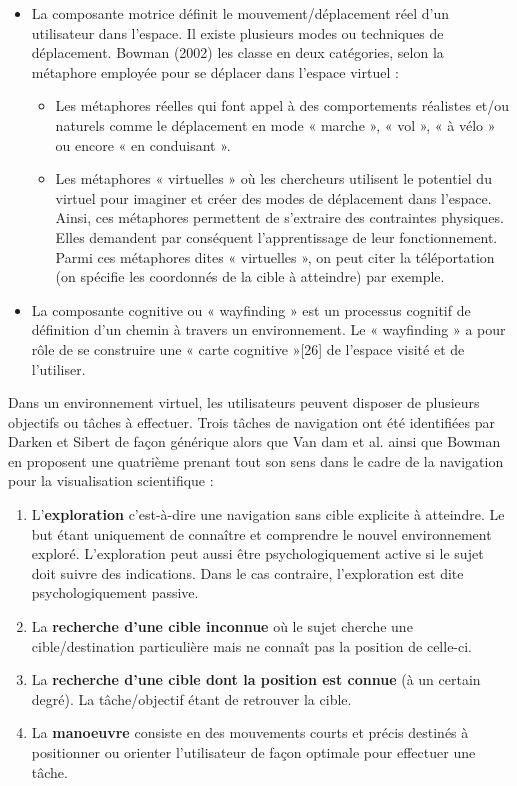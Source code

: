 \begin{itemize}
  \item La composante motrice définit le mouvement/déplacement réel d’un utilisateur dans l’espace. Il existe plusieurs modes ou techniques de déplacement. Bowman (2002) les classe en deux catégories, selon la métaphore employée pour se déplacer dans l’espace virtuel :
    \begin{itemize}
      \item Les métaphores réelles qui font appel à des comportements réalistes et/ou naturels comme le déplacement en mode « marche », « vol », « à vélo » ou encore « en conduisant ».
      \item Les métaphores « virtuelles » où les chercheurs utilisent le potentiel du virtuel pour imaginer et créer des modes de déplacement dans l’espace. Ainsi, ces métaphores permettent de s’extraire des contraintes physiques. Elles demandent par conséquent l’apprentissage de leur fonctionnement. Parmi ces métaphores dites « virtuelles », on peut citer la téléportation (on spécifie les coordonnés de la cible à atteindre) par exemple.
    \end{itemize}
  \item La composante cognitive ou « wayfinding » est un processus cognitif de définition d’un chemin à travers un environnement. Le « wayfinding » a pour rôle de se construire une « carte cognitive »[26] de l’espace visité et de l’utiliser.
\end{itemize}

Dans un environnement virtuel, les utilisateurs peuvent disposer de plusieurs objectifs ou tâches à effectuer. Trois tâches de navigation ont été identifiées par Darken et Sibert \cite{darken1996navigating} de façon générique alors que Van dam et al. \cite{van_dam_immersive_2000} ainsi que Bowman \cite{bowman_doug_a_3d_2002} en proposent une quatrième prenant tout son sens dans le cadre de la navigation pour la visualisation scientifique :

\begin{enumerate}
  \item  L'\textbf{exploration} c’est-à-dire une navigation sans cible explicite à atteindre. Le but étant uniquement de connaître et comprendre le nouvel environnement exploré. L’exploration peut aussi être psychologiquement active si le sujet doit suivre des indications. Dans le cas contraire, l’exploration est dite psychologiquement passive.
  \item La \textbf{recherche d'une cible inconnue} où le sujet cherche une cible/destination particulière mais ne connaît pas la position de celle-ci.
  \item La \textbf{recherche d'une cible dont la position est connue} (à un certain degré). La tâche/objectif étant de retrouver la cible.
  \item La \textbf{manoeuvre} consiste en des mouvements courts et précis destinés à positionner ou orienter l'utilisateur de façon optimale pour effectuer une tâche.
\end{enumerate}


